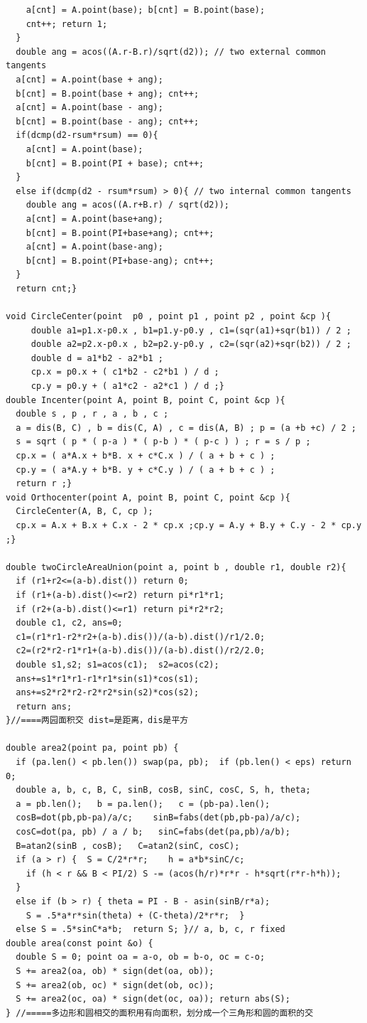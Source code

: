 \documentclass[10pt,landscape]{article}
\begin{document}
\begin{multicols}{2}
\begin{lstlisting}
    a[cnt] = A.point(base); b[cnt] = B.point(base);
    cnt++; return 1;
  }
  double ang = acos((A.r-B.r)/sqrt(d2)); // two external common tangents
  a[cnt] = A.point(base + ang);
  b[cnt] = B.point(base + ang); cnt++;
  a[cnt] = A.point(base - ang);
  b[cnt] = B.point(base - ang); cnt++;
  if(dcmp(d2-rsum*rsum) == 0){
    a[cnt] = A.point(base);
    b[cnt] = B.point(PI + base); cnt++;
  }
  else if(dcmp(d2 - rsum*rsum) > 0){ // two internal common tangents
    double ang = acos((A.r+B.r) / sqrt(d2));
    a[cnt] = A.point(base+ang);
    b[cnt] = B.point(PI+base+ang); cnt++;
    a[cnt] = A.point(base-ang);
    b[cnt] = B.point(PI+base-ang); cnt++;
  }
  return cnt;}

void CircleCenter(point  p0 , point p1 , point p2 , point &cp ){ 
     double a1=p1.x-p0.x , b1=p1.y-p0.y , c1=(sqr(a1)+sqr(b1)) / 2 ;
     double a2=p2.x-p0.x , b2=p2.y-p0.y , c2=(sqr(a2)+sqr(b2)) / 2 ;
     double d = a1*b2 - a2*b1 ;
     cp.x = p0.x + ( c1*b2 - c2*b1 ) / d ;
     cp.y = p0.y + ( a1*c2 - a2*c1 ) / d ;}
double Incenter(point A, point B, point C, point &cp ){ 
  double s , p , r , a , b , c ;
  a = dis(B, C) , b = dis(C, A) , c = dis(A, B) ; p = (a +b +c) / 2 ;
  s = sqrt ( p * ( p-a ) * ( p-b ) * ( p-c ) ) ; r = s / p ;
  cp.x = ( a*A.x + b*B. x + c*C.x ) / ( a + b + c ) ;
  cp.y = ( a*A.y + b*B. y + c*C.y ) / ( a + b + c ) ;
  return r ;}
void Orthocenter(point A, point B, point C, point &cp ){ 
  CircleCenter(A, B, C, cp );
  cp.x = A.x + B.x + C.x - 2 * cp.x ;cp.y = A.y + B.y + C.y - 2 * cp.y ;}

double twoCircleAreaUnion(point a, point b , double r1, double r2){
  if (r1+r2<=(a-b).dist()) return 0;
  if (r1+(a-b).dist()<=r2) return pi*r1*r1;
  if (r2+(a-b).dist()<=r1) return pi*r2*r2;
  double c1, c2, ans=0;
  c1=(r1*r1-r2*r2+(a-b).dis())/(a-b).dist()/r1/2.0;
  c2=(r2*r2-r1*r1+(a-b).dis())/(a-b).dist()/r2/2.0;
  double s1,s2; s1=acos(c1);  s2=acos(c2);
  ans+=s1*r1*r1-r1*r1*sin(s1)*cos(s1);
  ans+=s2*r2*r2-r2*r2*sin(s2)*cos(s2);
  return ans;
}//====两园面积交 dist=是距离，dis是平方

double area2(point pa, point pb) {
  if (pa.len() < pb.len()) swap(pa, pb);  if (pb.len() < eps) return 0;
  double a, b, c, B, C, sinB, cosB, sinC, cosC, S, h, theta;
  a = pb.len();   b = pa.len();   c = (pb-pa).len();
  cosB=dot(pb,pb-pa)/a/c;    sinB=fabs(det(pb,pb-pa)/a/c);  
  cosC=dot(pa, pb) / a / b;   sinC=fabs(det(pa,pb)/a/b);
  B=atan2(sinB , cosB);   C=atan2(sinC, cosC);
  if (a > r) {  S = C/2*r*r;    h = a*b*sinC/c;
    if (h < r && B < PI/2) S -= (acos(h/r)*r*r - h*sqrt(r*r-h*h));
  }
  else if (b > r) { theta = PI - B - asin(sinB/r*a);
    S = .5*a*r*sin(theta) + (C-theta)/2*r*r;  }
  else S = .5*sinC*a*b;  return S; }// a, b, c, r fixed
double area(const point &o) {
  double S = 0; point oa = a-o, ob = b-o, oc = c-o;
  S += area2(oa, ob) * sign(det(oa, ob));
  S += area2(ob, oc) * sign(det(ob, oc));
  S += area2(oc, oa) * sign(det(oc, oa)); return abs(S);
} //=====多边形和圆相交的面积用有向面积，划分成一个三角形和圆的面积的交 


\end{lstlisting}
\end{multicols}
\end{document}
